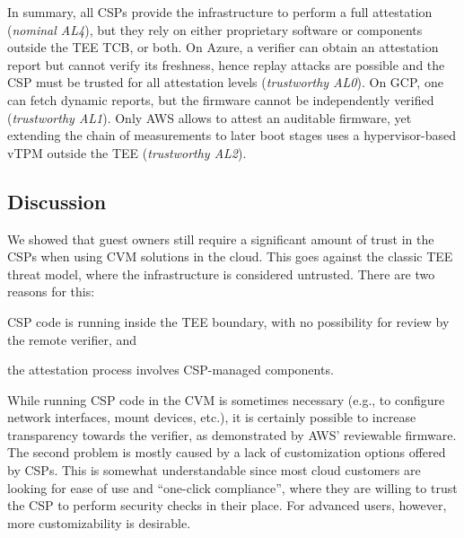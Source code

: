 In summary, all \acp{CSP} provide the infrastructure to perform a full
attestation (\emph{nominal AL4}), but they rely on either proprietary software
or components outside the \ac{TEE} TCB, or both. On Azure, a verifier can obtain
an attestation report but cannot verify its freshness, hence replay attacks are
possible and the \ac{CSP} must be trusted for all attestation levels
(\emph{trustworthy AL0}). On \ac{GCP}, one can fetch dynamic reports, but the
firmware cannot be independently verified (\emph{trustworthy AL1}). Only
\ac{AWS} allows to attest an auditable firmware, yet extending the chain of
measurements to later boot stages uses a hypervisor-based \ac{vTPM} outside the
\ac{TEE} (\emph{trustworthy AL2}).

\subsection{Discussion}

We showed that guest owners still require a significant amount of trust
in the \acp{CSP} when using \ac{CVM} solutions in the cloud. This goes against
the classic \ac{TEE} threat model, where the infrastructure is considered
untrusted. There are two reasons for this:
%
\begin{inparaenum}
    \item \ac{CSP} code is running inside the \ac{TEE} boundary, with no
    possibility for review by the remote verifier, and
    \item the attestation process involves \ac{CSP}-managed components.
\end{inparaenum}
%
While running \ac{CSP} code in the \ac{CVM} is sometimes necessary (e.g., to
configure network interfaces, mount devices, etc.), it is certainly possible to
increase transparency towards the verifier, as demonstrated by \ac{AWS}'
reviewable firmware. The second problem is mostly caused by a lack of
customization options offered by \acp{CSP}. This is somewhat understandable
since most cloud customers are looking for ease of use and ``one-click
compliance'', where they are willing to trust the \ac{CSP} to perform security
checks in their place. For advanced users, however, more customizability is
desirable.



